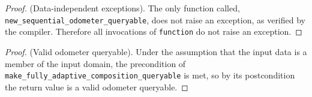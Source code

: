 \documentclass{article}
\begin{document}
\begin{proof} \textup{(Data-independent exceptions).} 
    The only function called, \texttt{new\_sequential\_odometer\_queryable},
    does not raise an exception, as verified by the compiler. 
    Therefore all invocations of \texttt{function} do not raise an exception.
\end{proof}

\begin{proof} \textup{(Valid odometer queryable).} 
    Under the assumption that the input data is a member of the input domain,
    the precondition of \texttt{make\_fully\_adaptive\_composition\_queryable} is met,
    so by its postcondition the return value is a valid odometer queryable.
\end{proof}
\end{document}
